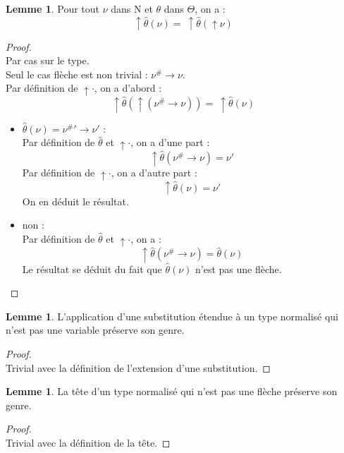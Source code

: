 \documentclass[a4paper]{report}
\newenvironment{preuve} 
  {\begin{proof}~\\} 
  {\end{proof}}
\theoremstyle{definition}
\newtheorem{lemme}[theoreme]{Lemme}
\newcommand{\N}{\mathrm{N}}
\begin{document}
\begin{lemme} \label{tete_subst_eq_tete_subst_tete}
  Pour tout $\nu$ dans $\N$ et $\theta$ dans $\Theta$, on a :
  \[ \uparrow \hat\theta (\nu) =\ \uparrow \hat\theta (\uparrow \nu) \]
\end{lemme}

\begin{preuve}
  Par cas sur le type. \\
  Seul le cas flèche est non trivial : $\nu^\# \rightarrow \nu$. \\
  Par définition de $\uparrow \cdot$, on a d'abord :
  \[ \uparrow \hat\theta (\uparrow (\nu^\# \rightarrow \nu)) =\ \uparrow \hat\theta (\nu) \]
  \begin{itemize}[label={\textbf{Si}}]
    \item 
      $\hat\theta (\nu) = {\nu^\#}' \rightarrow \nu'$ : \\
      Par définition de $\hat\theta$ et $\uparrow \cdot$, on a d'une part :
      \[ \uparrow \hat\theta (\nu^\# \rightarrow \nu) = \nu' \]
      Par définition de $\uparrow \cdot$, on a d'autre part :
      \[ \uparrow \hat\theta (\nu) = \nu' \]
      On en déduit le résultat.
    \item 
      non : \\
      Par définition de $\hat\theta$ et $\uparrow \cdot$, on a :
      \[ \uparrow \hat\theta (\nu^\# \rightarrow \nu) = \hat\theta (\nu) \]
      Le résultat se déduit du fait que $\hat\theta (\nu)$ n'est pas une flèche.
  \end{itemize}
\end{preuve}

\begin{lemme} \label{non_var_implique_subst_preserve_genre}
  L'application d'une substitution étendue à un type normalisé qui n'est pas une variable préserve son genre.
\end{lemme}

\begin{preuve}
  Trivial avec la définition de l'extension d'une substitution.
\end{preuve}

\begin{lemme} \label{non_fleche_implique_tete_preserve_genre}
  La tête d'un type normalisé qui n'est pas une flèche préserve son genre.
\end{lemme}

\begin{preuve}
  Trivial avec la définition de la tête.
\end{preuve}
\end{document}
